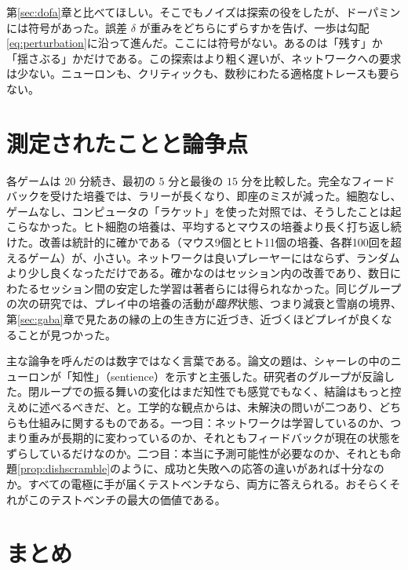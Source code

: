 第\ref{sec:dofa}章と比べてほしい。そこでもノイズは探索の役をしたが、ドーパミンには符号があった。誤差 $\delta$ が重みをどちらにずらすかを告げ、一歩は勾配\eqref{eq:perturbation}に沿って進んだ。ここには符号がない。あるのは「残す」か「揺さぶる」かだけである。この探索はより粗く遅いが、ネットワークへの要求は少ない。ニューロンも、クリティックも、数秒にわたる適格度トレースも要らない。

\section{測定されたことと論争点}

各ゲームは $20$ 分続き、最初の $5$ 分と最後の $15$ 分を比較した。完全なフィードバックを受けた培養では、ラリーが長くなり、即座のミスが減った。細胞なし、ゲームなし、コンピュータの「ラケット」を使った対照では、そうしたことは起こらなかった。ヒト細胞の培養は、平均するとマウスの培養より長く打ち返し続けた。改善は統計的に確かである（マウス9個とヒト11個の培養、各群100回を超えるゲーム）が、小さい。ネットワークは良いプレーヤーにはならず、ランダムより少し良くなっただけである。確かなのはセッション内の改善であり、数日にわたるセッション間の安定した学習は著者らには得られなかった\cite{Kagan2022}。同じグループの次の研究では、プレイ中の培養の活動が\emph{臨界}状態、つまり減衰と雪崩の境界、第\ref{sec:gaba}章で見たあの縁の上の生き方に近づき、近づくほどプレイが良くなることが見つかった\cite{Habibollahi2023}。

主な論争を呼んだのは数字ではなく言葉である。論文の題は、シャーレの中のニューロンが「知性」（sentience）を示すと主張した。研究者のグループが反論した。閉ループでの振る舞いの変化はまだ知性でも感覚でもなく、結論はもっと控えめに述べるべきだ、と\cite{Balci2023}。工学的な観点からは、未解決の問いが二つあり、どちらも仕組みに関するものである。一つ目：ネットワークは学習しているのか、つまり重みが長期的に変わっているのか、それともフィードバックが現在の状態をずらしているだけなのか。二つ目：本当に予測可能性が必要なのか、それとも命題\ref{prop:dishscramble}のように、成功と失敗への応答の違いがあれば十分なのか。すべての電極に手が届くテストベンチなら、両方に答えられる。おそらくそれがこのテストベンチの最大の価値である。



\section{まとめ}

